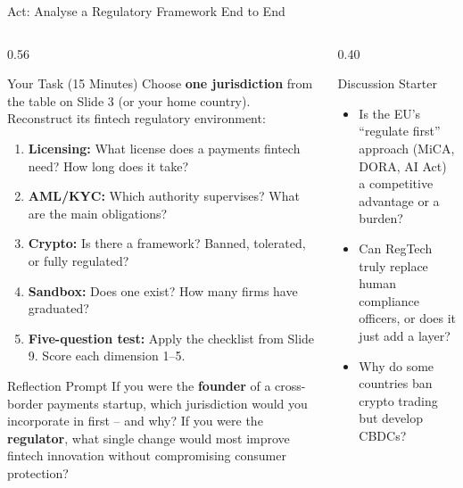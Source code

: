 \documentclass[aspectratio=169, 11pt]{beamer}
\begin{document}
\begin{frame}{Act: Analyse a Regulatory Framework End to End}

\begin{columns}[T]
\begin{column}{0.56\textwidth}
\begin{block}{Your Task (15 Minutes)}
\scriptsize
Choose \textbf{one jurisdiction} from the table on Slide 3 (or your home country). Reconstruct its fintech regulatory environment:
\begin{enumerate}\scriptsize
  \item \textbf{Licensing:} What license does a payments fintech need? How long does it take?
  \item \textbf{AML/KYC:} Which authority supervises? What are the main obligations?
  \item \textbf{Crypto:} Is there a framework? Banned, tolerated, or fully regulated?
  \item \textbf{Sandbox:} Does one exist? How many firms have graduated?
  \item \textbf{Five-question test:} Apply the checklist from Slide 9. Score each dimension 1--5.
\end{enumerate}
\end{block}
\vspace{0.2em}
\begin{exampleblock}{Reflection Prompt}
\scriptsize
If you were the \textbf{founder} of a cross-border payments startup, which jurisdiction would you incorporate in first -- and why? If you were the \textbf{regulator}, what single change would most improve fintech innovation without compromising consumer protection?
\end{exampleblock}
\end{column}
\begin{column}{0.40\textwidth}
\begin{exampleblock}{Discussion Starter}
\scriptsize
\begin{itemize}
  \item Is the EU's ``regulate first'' approach (MiCA, DORA, AI Act) a competitive advantage or a burden?
  \item Can RegTech truly replace human compliance officers, or does it just add a layer?
  \item Why do some countries ban crypto trading but develop CBDCs?

\end{itemize}
\end{exampleblock}
\end{column}
\end{columns}
\end{frame}
\end{document}
